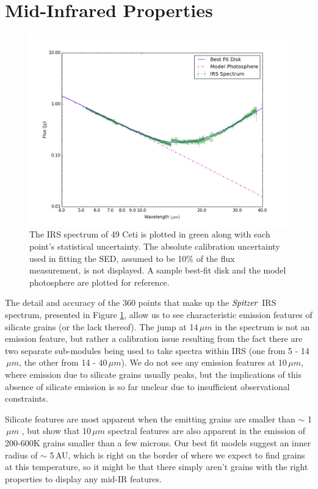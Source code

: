 {{\section{Mid-Infrared Properties}
\label{MidIR}

\begin{figure}[t!]
\centering
\includegraphics[width = 1\textwidth]{49CET_IRS_Window.png}
\caption{The IRS spectrum of 49 Ceti is plotted in green along with each point's statistical uncertainty. The absolute calibration uncertainty used in fitting the SED, assumed to be 10$\%$ of the flux measurement, is not displayed. A sample best-fit disk and the model photosphere are plotted for reference.}
\label{fig:49CET_IRS_Window}
\end{figure}


The detail and accuracy of the 360 points that make up the $\it{Spitzer}$ IRS spectrum, presented in Figure \ref{fig:49CET_IRS_Window}, allow us to see characteristic emission features of silicate grains (or the lack thereof). The jump at 14$\,\mu m$ in the spectrum is not an emission feature, but rather a calibration issue resulting from the fact there are two separate sub-modules being used to take spectra within IRS (one from 5 - 14$\,\mu m$, the other from 14 - 40$\,\mu m$). We do not see any emission features at 10$\,\mu m$, where emission due to silicate grains usually peaks, but the implications of this absence of silicate emission is so far unclear due to insufficient observational constraints. 

Silicate features are most apparent when the emitting grains are smaller than $\sim$ 1$\,\mu m$ \citep{Papo83}, but  \cite{Natt07} show that 10$\,\mu m$ spectral features are also apparent in the emission of 200-600K grains smaller than a few microns. Our best fit models suggest an inner radius of $\sim$ 5\,AU, which is right on the border of where we expect to find grains at this temperature,  so it might be that there simply aren't grains with the right properties to display any mid-IR features. 

}}
